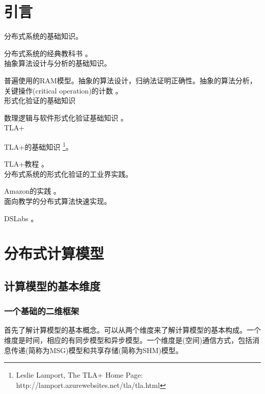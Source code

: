\chapter{引言}

分布式系统的基础知识。

\myleaf 分布式系统的经典教科书 \cite{Tanenbaum06}。\\

抽象算法设计与分析的基础知识。

\myleaf 普遍使用的RAM模型。抽象的算法设计，归纳法证明正确性。抽象的算法分析，关键操作(critical operation)的计数 \cite{Cormen09, Huang20-book}。\\

形式化验证的基础知识

\myleaf 数理逻辑与软件形式化验证基础知识 \cite{Huth04}。\\

TLA+

\myleaf TLA+的基础知识 \footnote{Leslie Lamport, The TLA+ Home Page: http://lamport.azurewebsites.net/tla/tla.html}。

\myleaf TLA+教程 \cite{Wayne18}。\\

分布式系统的形式化验证的工业界实践。

\myleaf Amazon的实践 \cite{Newcombe15}。\\

面向教学的分布式算法快速实现。

\myleaf DSLabs \cite{Michael19}。

\chapter{分布式计算模型}

\section{计算模型的基本维度}

\subsection{一个基础的二维框架}

首先了解计算模型的基本概念。可以从两个维度来了解计算模型的基本构成。一个维度是时间，相应的有同步模型和异步模型。一个维度是(空间)通信方式，包括消息传递(简称为MSG)模型和共享存储(简称为SHM)模型。

